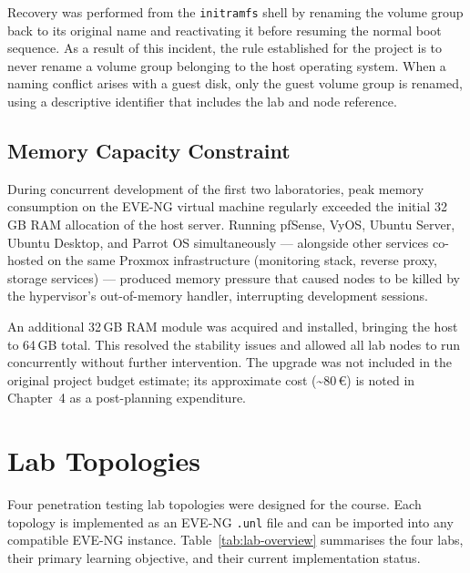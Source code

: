 Recovery was performed from the \texttt{initramfs} shell by renaming the volume
group back to its original name and reactivating it before resuming the normal boot
sequence. As a result of this incident, the rule established for the project is to
never rename a volume group belonging to the host operating system. When a naming
conflict arises with a guest disk, only the guest volume group is renamed, using a
descriptive identifier that includes the lab and node reference.

\subsection{Memory Capacity Constraint}

During concurrent development of the first two laboratories, peak memory
consumption on the EVE-NG virtual machine regularly exceeded the initial
32\,GB RAM allocation of the host server. Running pfSense, VyOS, Ubuntu Server,
Ubuntu Desktop, and Parrot OS simultaneously --- alongside other services
co-hosted on the same Proxmox infrastructure (monitoring stack, reverse proxy,
storage services) --- produced memory pressure that caused nodes to be killed
by the hypervisor's out-of-memory handler, interrupting development sessions.

An additional 32\,GB RAM module was acquired and installed, bringing the host
to 64\,GB total. This resolved the stability issues and allowed all lab nodes
to run concurrently without further intervention. The upgrade was not included
in the original project budget estimate; its approximate cost
(\textasciitilde 80\,\euro) is noted in Chapter~4 as a post-planning expenditure.


\section{Lab Topologies}

Four penetration testing lab topologies were designed for the course. Each topology
is implemented as an EVE-NG \texttt{.unl} file and can be imported into any
compatible EVE-NG instance. Table~\ref{tab:lab-overview} summarises the four labs,
their primary learning objective, and their current implementation status.

